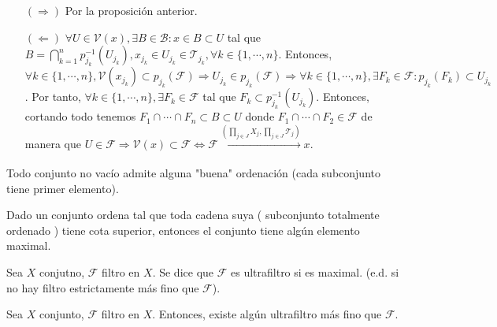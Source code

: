 \begin{dem}
  \begin{enumerate}[label=(\roman*)]
    \item []
    \item [$(\Rightarrow)$] Por la proposición anterior.
    \item [$(\Leftarrow)$] $\forall U \in \mathcal{V}(x), \exists B \in \mathcal{B} : x \in B \subset U$ tal que $B = \bigcap_{k = 1}^{n} p_{j_{k}}^{-1}(U_{j_{k}}), x_{j_{k}} \in U_{j_{k}} \in \mathcal{T}_{j_{k}}, \forall k \in \{ 1, \cdots, n \}$. Entonces, $\forall k \in \{ 1, \cdots, n \}, \mathcal{V}(x_{j_{k}}) \subset p_{j_{k}}(\mathcal{F}) \Rightarrow U_{j_{k}} \in p_{j_{k}}(\mathcal{F}) \Rightarrow \forall k \in \{ 1, \cdots, n \}, \exists F_{k} \in \mathcal{F} : p_{j_{k}}(F_{k}) \subset U_{j_{k}}$. Por tanto, $\forall k \in \{ 1, \cdots, n \}, \exists F_{k} \in \mathcal{F}$ tal que $F_{k} \subset p_{j_{k}}^{-1}(U_{j_{k}})$. Entonces, cortando todo tenemos $F_{1} \cap \cdots \cap F_{n} \subset B \subset U$ donde $F_{1} \cap \cdots \cap F_{2} \in \mathcal{F}$ de manera que $U \in \mathcal{F} \Rightarrow \mathcal{V}(x) \subset \mathcal{F} \Leftrightarrow \mathcal{F} \xrightarrow[]{ ( \prod_{j \in J} X_{j}, \prod_{j \in J} \mathcal{T}_{j} ) } x$.
  \end{enumerate}
\end{dem}

\begin{prop}
  Todo conjunto no vacío admite alguna "buena" ordenación (cada subconjunto tiene primer elemento).
\end{prop}

\begin{prop}
  Dado un conjunto ordena tal que toda cadena suya ( subconjunto totalmente ordenado ) tiene cota superior, entonces el conjunto tiene algún elemento maximal.
\end{prop}

\begin{defn}[Ultrafiltro]
  Sea $X$ conjutno, $\mathcal{F }$ filtro en $X$. Se dice que $\mathcal{F}$ es ultrafiltro si es maximal. (e.d. si no hay filtro estrictamente más fino que $\mathcal{F}$).
\end{defn}

\begin{prop}
  Sea $X$ conjunto, $\mathcal{F}$ filtro en $X$. Entonces, existe algún ultrafiltro más fino que $\mathcal{F}$.
\end{prop}

